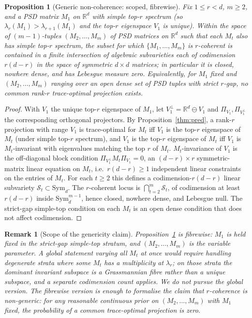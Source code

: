 \documentclass[final,3p,times]{elsarticle}
\newtheorem{proposition}[theorem]{Proposition}
\newtheorem{remark}[theorem]{Remark}
\newcommand{\R}{\mathbb{R}}
\begin{document}
\begin{proposition}[Generic non-coherence: scoped, fibrewise]
\label{prop:generic}
Fix $1\le r<d$, $m\ge 2$, and a PSD matrix $M_1$ on $\R^d$ with simple
top-$r$ spectrum (so $\lambda_r(M_1)>\lambda_{r+1}(M_1)$ and the top-$r$
eigenspace $V_1$ is unique).
Within the space of $(m-1)$-tuples $(M_2,\ldots,M_m)$ of PSD matrices on
$\R^d$ such that each $M_t$ also has simple top-$r$ spectrum, the subset
for which $\{M_1,\ldots,M_m\}$ is $r$-coherent is contained in a finite
intersection of algebraic subvarieties each of codimension $r(d-r)$ in
the space of symmetric $d\times d$ matrices; in particular it is closed,
nowhere dense, and has Lebesgue measure zero.
Equivalently, for $M_1$ fixed and $(M_2,\ldots,M_m)$ ranging over an
open dense set of PSD tuples with strict $r$-gap, no common rank-$r$
trace-optimal projection exists.
\end{proposition}

\begin{proof}
With $V_1$ the unique top-$r$ eigenspace of $M_1$, let
$V_1^\perp=\R^d\ominus V_1$ and $\Pi_{V_1},\Pi_{V_1^\perp}$ the
corresponding orthogonal projectors.
By Proposition~\ref{thm:pred}, a rank-$r$ projection with range $V_1$
is trace-optimal for $M_t$ iff $V_1$ is the top-$r$ eigenspace of $M_t$
(under simple top-$r$ spectrum), and $V_1$ is the top-$r$ eigenspace of
$M_t$ iff $V_1$ is $M_t$-invariant with eigenvalues matching the top
$r$ of $M_t$.
$M_t$-invariance of $V_1$ is the off-diagonal block condition
$\Pi_{V_1^\perp}M_t\Pi_{V_1}=0$, an $(d-r)\times r$ symmetric-matrix
linear equation on $M_t$, i.e.\ $r(d-r)\ge 1$ independent linear
constraints on the entries of $M_t$.
For each $t\ge 2$ this defines a codimension-$r(d-r)$ linear subvariety
$\mathcal{S}_t\subset\mathrm{Sym}_d$.
The $r$-coherent locus is $\bigcap_{t=2}^m\mathcal{S}_t$, of codimension
at least $r(d-r)$ inside $\mathrm{Sym}_d^{m-1}$, hence closed, nowhere
dense, and Lebesgue null.
The strict-gap simple-top condition on each $M_t$ is an open dense
condition that does not affect codimension.
\end{proof}

\begin{remark}[Scope of the genericity claim]
\label{rem:genericscope}
Proposition~\ref{prop:generic} is fibrewise: $M_1$ is held fixed in the
strict-gap simple-top stratum, and $(M_2,\ldots,M_m)$ is the variable
parameter.
A global statement varying all $M_t$ at once would require handling
degenerate strata where some $M_t$ has a multiplicity at $\lambda_r$;
on those strata the dominant invariant subspace is a Grassmannian
fibre rather than a unique subspace, and a separate codimension count
applies.
We do not pursue the global version.
The fibrewise version is enough to formalise the claim that
$r$-coherence is non-generic: for any reasonable continuous prior on
$(M_2,\ldots,M_m)$ with $M_1$ fixed, the probability of a common
trace-optimal projection is zero.
\end{remark}
\end{document}

